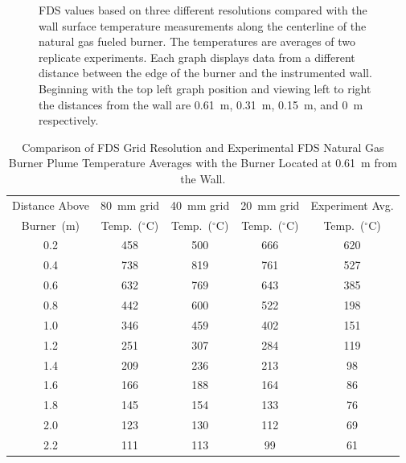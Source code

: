 \documentclass[twoside]{uocthesis}
\begin{document}
\begin{figure}[ht!]
  \caption[FDS values based on three different resolutions compared with the wall surface temperature measurements along the centerline of the natural gas fueled burner]{FDS values based on three different resolutions compared with the wall surface temperature measurements along the centerline of the natural gas fueled burner. The temperatures are averages of two replicate experiments. Each graph displays data from a different distance between the edge of the burner and the instrumented wall.  Beginning with the top left graph position and viewing left to right the distances from the wall are 0.61~m, 0.31~m, 0.15~m, and 0~m respectively.}
  \label{FDS_Wall_Temp_TWNG_comp}
\end{figure}



\begin{table}
	\small
	\centering
	\begin{tabular}{|c|c|c|c|c|}
		\hline Distance Above  & 80~mm grid      & 40~mm grid     & 20~mm grid 		& Experiment Avg. \\
		Burner~(m)	   & Temp.~($^{\circ}$C) & Temp.~($^{\circ}$C) & Temp.~($^{\circ}$C)  & Temp.~($^{\circ}$C)	\\ \hline
		\hline 0.2 			   & 458						& 500					& 666 			& 620 	\\
		\hline 0.4			   & 738					   	& 819					& 761			& 527 	\\
		\hline 0.6			   & 632						& 769					& 643			& 385 	\\
		\hline 0.8			   & 442						& 600					& 522			& 198	\\
		\hline 1.0			   & 346						& 459 					& 402			& 151	\\
		\hline 1.2			   & 251						& 307 					& 284			& 119	\\
		\hline 1.4			   & 209						& 236 					& 213			& 98	\\
		\hline 1.6			   & 166						& 188 					& 164			& 86	\\
		\hline 1.8			   & 145						& 154 					& 133			& 76	\\
		\hline 2.0			   & 123						& 130 					& 112			& 69	\\
		\hline 2.2			   & 111						& 113 					& 99			& 61	\\
		\hline
	\end{tabular}
	\caption[Comparison of FDS Grid Resolution and Experimental FDS Natural Gas Burner Plume Temperatures, 0.61~m from the Wall]{Comparison of FDS Grid Resolution and Experimental FDS Natural Gas Burner Plume Temperature Averages with the Burner Located at 0.61~m from the Wall.}
	\label{tab:FDSRI_Exp_Plume2d}
\end{table}
\end{document}
